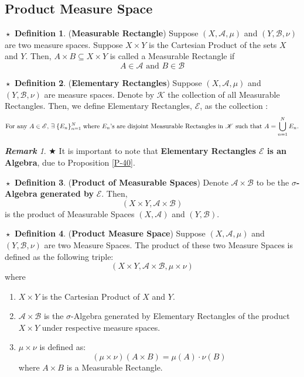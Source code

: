 \documentclass{article}
\theoremstyle{definition}
\newtheorem{definition}{$\boxed{\star}$ Definition}
\theoremstyle{remark}
\newtheorem*{remark}{\textbf{Remark}}
\theoremstyle{definition}
\theoremstyle{definition}
\theoremstyle{definition}
\newcommand{\bunion}{\bigcup}
\newcommand{\alg}[1]{\mathscr{#1}}
\begin{document}
\subsection{Product Measure Space}
\begin{definition}
	(\textbf{Measurable Rectangle}) Suppose $ (X,\alg{A},\mu) $ and $ (Y,\alg{B},\nu) $ are two measure spaces. Suppose $ X\times Y $ is the Cartesian Product of the sets $ X $ and $ Y $. Then, $ A\times B \subseteq X\times Y$ is called a Measurable Rectangle if
	\[A\in \alg{A}\text{ and } B\in \alg{B}\]
\end{definition}
\hrulefill
\begin{definition}
	(\textbf{Elementary Rectangles}) Suppose $ (X,\alg{A},\mu) $ and $ (Y,\alg{B},\nu) $ are measure spaces. Denote by $ \alg{K} $ the collection of all Measurable Rectangles. Then, we define Elementary Rectangles, $ \alg{E} $, as the collection :
	\[\text{For any $ A \in \alg{E} $, }\exists \;\{E_n\}_{n=1}^{N} \;\text{where $ E_n $'s are disjoint Measurable Rectangles in $\alg{K}  $ such that } A = \bunion_{n=1}^{N} E_n.\]
\end{definition}
\begin{remark}
$ \bigstar $ It is important to note that\textbf{ Elementary Rectangles $ \alg{E} $ is an Algebra}, due to Proposition \ref{P-40}.
\end{remark}
\hrulefill
\begin{definition}
	(\textbf{Product of Measurable Spaces}) Denote $ \alg{A} \times \alg{B}$ to be the $ \sigma $\textbf{-Algebra generated by} $ \alg{E} $. Then, 
	\[(X\times Y, \alg{A}\times\alg{B})\]
	is the product of Measurable Spaces $ (X,\alg{A}) $ and $ (Y,\alg{B}) $.
\end{definition}
\hrulefill
\begin{definition}
	(\textbf{Product Measure Space}) Suppose $ (X,\alg{A},\mu) $ and $ (Y,\alg{B},\nu) $ are two Measure Spaces. The product of these two Measure Spaces is defined as the following triple:
	\[\left (X\times Y, \alg{A}\times \alg{B},\mu \times \nu\right )\]
	where
	\begin{enumerate}
		\item {$ X\times Y $ is the Cartesian Product of $ X $ and $ Y $.}
		\item {$ \alg{A}\times\alg{B} $ is the $ \sigma $-Algebra generated by Elementary Rectangles of the product $ X\times Y $ under respective measure spaces.}
		\item {$ \mu \times \nu $ is defined as:
	\[\left (\mu \times \nu\right )(A\times B) = \mu(A) \cdot \nu(B)\]	
	where $ A\times B $ is a Measurable Rectangle.
	}
	\end{enumerate}
\end{definition}
\end{document}
